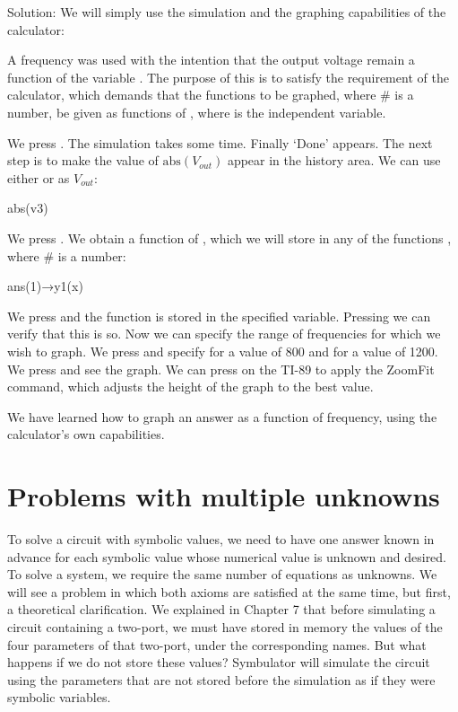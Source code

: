 Solution: We will simply use the simulation and the graphing
capabilities of the calculator:


A frequency  was used with the intention that the output
voltage remain a function of the variable . The purpose of
this is to satisfy the requirement of the calculator, which demands
that the functions  to be graphed, where \# is a number,
be given as functions of , where  is the independent
variable.

We press . The simulation takes some time. Finally `Done'
appears. The next step is to make the value of
$\mathrm{abs}(V_{out})$ appear in the history area. We can use
either  or  as $V_{out}$:

\begin{entry}
abs(v3)
\end{entry}

We press . We obtain a function of , which we
will store in any of the functions , where \# is a
number:

\begin{entry}
ans(1)→y1(x)
\end{entry}

We press  and the function is stored in the specified
variable. Pressing \key{$\diamond$}  we can verify that this
is so. Now we can specify the range of frequencies for which we wish
to graph. We press \key{$\diamond$}  and specify for
 a value of 800 and for  a value of 1200. We
press \key{$\diamond$}  and see the graph. We can press
  on the TI-89 to apply the ZoomFit command, which
adjusts the height of the graph to the best value.

We have learned how to graph an answer as a function of frequency,
using the calculator's own capabilities.

\section{Problems with multiple unknowns}

To solve a circuit with symbolic values, we need to have one answer
known in advance for each symbolic value whose numerical value is
unknown and desired. To solve a system, we require the same number
of equations as unknowns. We will see a problem in which both axioms
are satisfied at the same time, but first, a theoretical
clarification. We explained in Chapter 7 that before simulating a
circuit containing a two-port, we must have stored in memory the
values of the four parameters of that two-port, under the
corresponding names. But what happens if we do not store these
values? Symbulator will simulate the circuit using the parameters
that are not stored before the simulation as if they were symbolic
variables.

